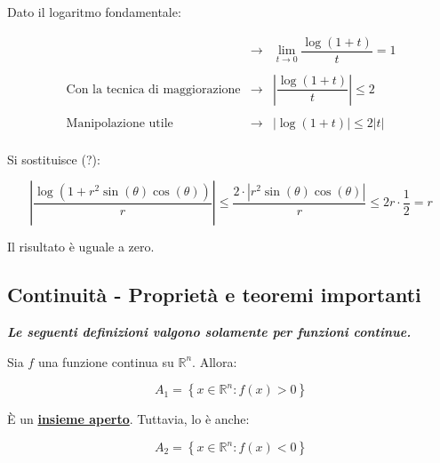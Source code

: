 \documentclass[a4paper]{article}
\begin{document}
	\noindent
	Dato il logaritmo fondamentale:
	
	\begin{equation*}
		\begin{array}{lll}
			& \longrightarrow & \lim_{t \rightarrow 0} \dfrac{\log\left(1+t\right)}{t} = 1 \\
			&& \\
			\text{Con la tecnica di maggiorazione} & \longrightarrow & \left|\dfrac{\log\left(1+t\right)}{t}\right| \le 2 \\
			&& \\
			\text{Manipolazione utile}			   & \longrightarrow & \left|\log\left(1+t\right)\right| \le 2\left|t\right| \\
		\end{array}
	\end{equation*}

	\noindent
	Si sostituisce (?):
	
	\begin{equation*}
		\left|\dfrac{\log\left(1 + r^{2} \sin\left(\theta\right) \cos\left(\theta\right)\right)}{r}\right| \le \dfrac{2 \cdot \left|r^{2} \sin\left(\theta\right) \cos\left(\theta\right)\right|}{r} \le 2 r \cdot \dfrac{1}{2} = r
	\end{equation*}

	\noindent
	Il risultato è uguale a zero.
	
	\newpage
	
	\subsection{Continuità - Proprietà e teoremi importanti}
	
	\textbf{\emph{Le seguenti definizioni valgono solamente per funzioni continue.}}\newline
	
	\noindent
	Sia $f$ una funzione continua su $\mathbb{R}^{n}$. Allora:
	
	\begin{equation*}
		A_{1} = \left\{x \in \mathbb{R}^{n} : f\left(x\right) > 0\right\}
	\end{equation*}
	
	È un \textcolor{Red3}{\textbf{\underline{insieme aperto}}}. Tuttavia, lo è anche:
	
	\begin{equation*}
		A_{2} = \left\{x \in \mathbb{R}^{n} : f\left(x\right) < 0\right\}
	\end{equation*}
	
\end{document}
